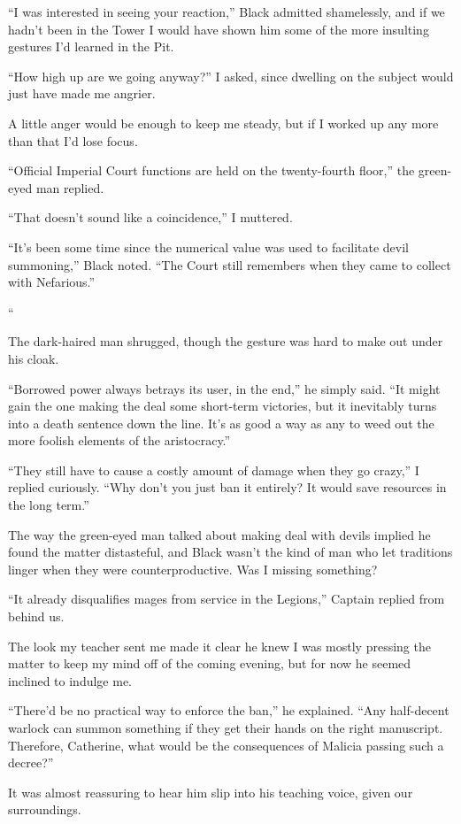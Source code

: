 \documentclass[12pt, openany]{book}
\begin{document}
“I was interested in seeing your reaction,” Black admitted shamelessly, and if we hadn’t been in the Tower I would have shown him some of the more insulting gestures I’d learned in the Pit.

“How high up are we going anyway?” I asked, since dwelling on the subject would just have made me angrier.

A little anger would be enough to keep me steady, but if I worked up any more than that I’d lose focus.

“Official Imperial Court functions are held on the twenty-fourth floor,” the green-eyed man replied.

“That doesn’t sound like a coincidence,” I muttered.

“It’s been some time since the numerical value was used to facilitate devil summoning,” Black noted. “The Court still remembers when they came to collect with Nefarious.”

“\textit{ }

The dark-haired man shrugged, though the gesture was hard to make out under his cloak.

“Borrowed power always betrays its user, in the end,” he simply said. “It might gain the one making the deal some short-term victories, but it inevitably turns into a death sentence down the line. It’s as good a way as any to weed out the more foolish elements of the aristocracy.”

“They still have to cause a costly amount of damage when they go crazy,” I replied curiously. “Why don’t you just ban it entirely? It would save resources in the long term.”

The way the green-eyed man talked about making deal with devils implied he found the matter distasteful, and Black wasn’t the kind of man who let traditions linger when they were counterproductive. Was I missing something?

“It already disqualifies mages from service in the Legions,” Captain replied from behind us.

The look my teacher sent me made it clear he knew I was mostly pressing the matter to keep my mind off of the coming evening, but for now he seemed inclined to indulge me.

“There’d be no practical way to enforce the ban,” he explained. “Any half-decent warlock can summon something if they get their hands on the right manuscript. Therefore, Catherine, what would be the consequences of Malicia passing such a decree?”

It was almost reassuring to hear him slip into his teaching voice, given our surroundings.
\end{document}
